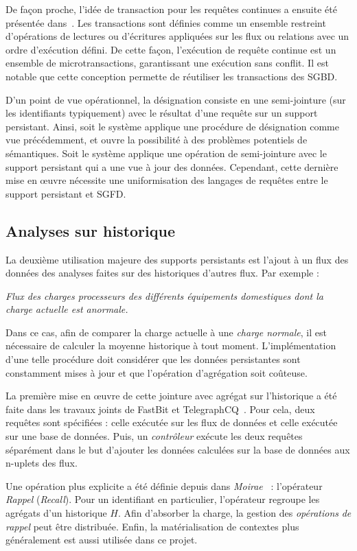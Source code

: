 De façon proche, l'idée de transaction pour les requêtes continues a ensuite été présentée dans~\cite{Botan:transaction}. Les transactions sont définies comme un ensemble restreint d'opérations de lectures ou d'écritures appliquées sur les flux ou relations avec un ordre d'exécution défini. De cette façon, l'exécution de requête continue est un ensemble de microtransactions, garantissant une exécution sans conflit. Il est notable que cette conception permette de réutiliser les transactions des SGBD.

D'un point de vue opérationnel, la désignation consiste en une semi-jointure (sur les identifiants typiquement) avec le résultat d'une requête sur un support persistant. Ainsi, soit le système applique une procédure de désignation comme vue précédemment, et ouvre la possibilité à des problèmes potentiels de sémantiques. Soit le système applique une opération de semi-jointure avec le support persistant qui a une vue à jour des données. Cependant, cette dernière mise en œuvre nécessite une uniformisation des langages de requêtes entre le support persistant et SGFD.

\subsection{Analyses sur historique}
La deuxième utilisation majeure des supports persistants est l'ajout à un flux des données des analyses faites sur des historiques d'autres flux. Par exemple :
\begin{center}
\it Flux des charges processeurs des différents équipements domestiques dont la charge actuelle est anormale.
\end{center}
Dans ce cas, afin de comparer la charge actuelle à une \textit{charge normale}, il est nécessaire de calculer la moyenne historique à tout moment. L'implémentation d'une telle procédure doit considérer que les données persistantes sont constamment mises à jour et que l'opération d'agrégation soit coûteuse. 

La première mise en œuvre de cette jointure avec agrégat sur l'historique a été faite dans les travaux joints de FastBit et TelegraphCQ~\cite{Reiss:fastbit}. Pour cela, deux requêtes sont spécifiées : celle exécutée sur les flux de données et celle exécutée sur une base de données. Puis, un \textit{contrôleur} exécute les deux requêtes séparément dans le but d'ajouter les données calculées sur la base de données aux n-uplets des flux.

Une opération plus explicite a été définie depuis dans \textit{Moirae}~\cite{Balazinska:moirae} : l'opérateur \textit{Rappel} (\textit{Recall}). Pour un identifiant en particulier, l'opérateur regroupe les agrégats d'un historique $H$. Afin d'absorber la charge, la gestion des \textit{opérations} \textit{de} \textit{rappel} peut être distribuée. Enfin, la matérialisation de contextes plus généralement est aussi utilisée dans ce projet.

